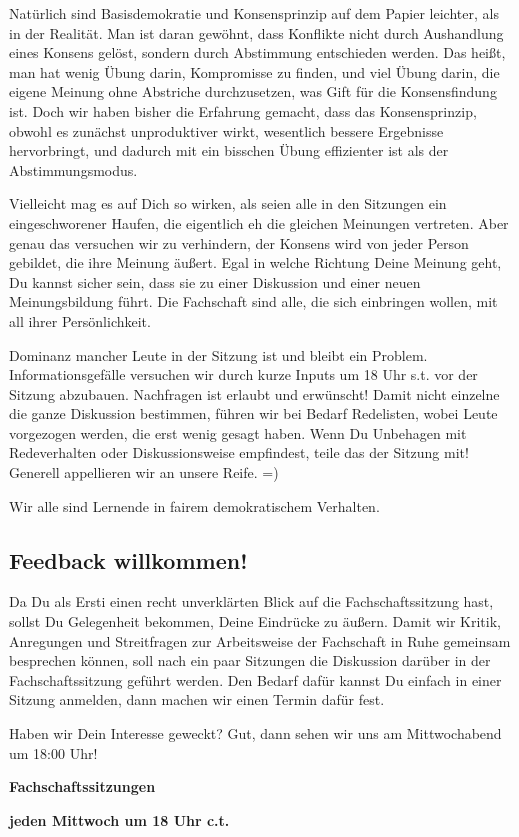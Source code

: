 Natürlich sind Basisdemokratie und Konsensprinzip auf dem Papier leichter, als in der Realität. Man ist daran gewöhnt, dass Konflikte nicht durch Aushandlung eines Konsens gelöst, sondern durch Abstimmung entschieden werden. Das heißt, man hat wenig Übung darin, Kompromisse zu finden, und viel Übung darin, die eigene Meinung ohne Abstriche durchzusetzen, was Gift für die Konsensfindung ist. Doch wir haben bisher die Erfahrung gemacht, dass das Konsensprinzip, obwohl es zunächst unproduktiver wirkt, wesentlich bessere Ergebnisse hervorbringt, und dadurch mit ein bisschen Übung effizienter ist als der Abstimmungsmodus.

Vielleicht mag es auf Dich so wirken, als seien alle in den Sitzungen ein eingeschworener Haufen, die eigentlich eh die gleichen Meinungen vertreten. Aber genau das versuchen wir zu verhindern, der Konsens wird von jeder Person gebildet, die ihre Meinung äußert. Egal in welche Richtung Deine Meinung geht, Du kannst sicher sein, dass sie zu einer Diskussion und einer neuen Meinungsbildung führt. Die Fachschaft sind alle, die sich einbringen wollen, mit all ihrer Persönlichkeit.

Dominanz mancher Leute in der Sitzung ist und bleibt ein Problem. Informationsgefälle versuchen wir durch kurze Inputs um 18 Uhr \gls{s.t.} vor der Sitzung abzubauen. Nachfragen ist erlaubt und erwünscht! Damit nicht einzelne die ganze Diskussion bestimmen, führen wir bei Bedarf Redelisten, wobei Leute vorgezogen werden, die erst wenig gesagt haben. Wenn Du Unbehagen mit Redeverhalten oder Diskussionsweise empfindest, teile das der Sitzung mit! Generell appellieren wir an unsere Reife. =)

Wir alle sind Lernende in fairem demokratischem Verhalten.

\subsection{Feedback willkommen!}
Da Du als Ersti einen recht unverklärten Blick auf die Fachschaftssitzung hast, sollst Du Gelegenheit bekommen, Deine Eindrücke zu äußern. Damit wir Kritik, Anregungen und Streitfragen zur Arbeitsweise der Fachschaft in Ruhe gemeinsam besprechen können, soll nach ein paar Sitzungen die Diskussion darüber in der Fachschaftssitzung geführt werden. Den Bedarf dafür kannst Du einfach in einer Sitzung anmelden, dann machen wir einen Termin dafür fest.

Haben wir Dein Interesse geweckt? Gut, dann sehen wir uns am Mittwochabend um 18:00 Uhr!

\begin{center}
\large
\textbf{Fachschaftssitzungen}

\textbf{jeden Mittwoch um 18 Uhr \gls{c.t.}}
\end{center}
